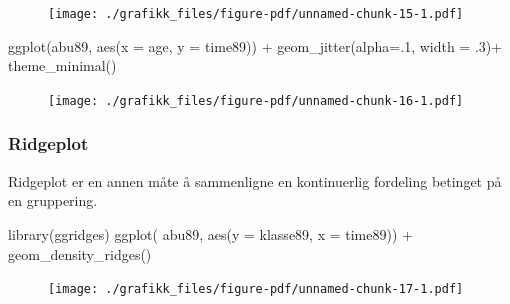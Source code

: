 \documentclass[
  letterpaper,
  DIV=11,
  numbers=noendperiod]{scrreprt}
\newenvironment{Shaded}{\begin{snugshade}}{\end{snugshade}}
\newcommand{\AttributeTok}[1]{\textcolor[rgb]{0.40,0.45,0.13}{#1}}
\newcommand{\DecValTok}[1]{\textcolor[rgb]{0.68,0.00,0.00}{#1}}
\newcommand{\FunctionTok}[1]{\textcolor[rgb]{0.28,0.35,0.67}{#1}}
\newcommand{\NormalTok}[1]{\textcolor[rgb]{0.00,0.23,0.31}{#1}}
\newcommand{\SpecialCharTok}[1]{\textcolor[rgb]{0.37,0.37,0.37}{#1}}
\theoremstyle{definition}
\theoremstyle{remark}
\begin{document}
\begin{figure}[H]

{\centering \texttt{[image: ./grafikk\_files/figure-pdf/unnamed-chunk-15-1.pdf]}

}

\end{figure}

\begin{Shaded}
\begin{Highlighting}[]
\FunctionTok{ggplot}\NormalTok{(abu89, }\FunctionTok{aes}\NormalTok{(}\AttributeTok{x =}\NormalTok{ age, }\AttributeTok{y =}\NormalTok{ time89)) }\SpecialCharTok{+}
  \FunctionTok{geom\_jitter}\NormalTok{(}\AttributeTok{alpha=}\NormalTok{.}\DecValTok{1}\NormalTok{, }\AttributeTok{width =}\NormalTok{ .}\DecValTok{3}\NormalTok{)}\SpecialCharTok{+}
  \FunctionTok{theme\_minimal}\NormalTok{()}
\end{Highlighting}
\end{Shaded}

\begin{figure}[H]

{\centering \texttt{[image: ./grafikk\_files/figure-pdf/unnamed-chunk-16-1.pdf]}

}

\end{figure}

\hypertarget{ridgeplot}{%
\subsubsection{Ridgeplot}\label{ridgeplot}}

Ridgeplot er en annen måte å sammenligne en kontinuerlig fordeling
betinget på en gruppering.

\begin{Shaded}
\begin{Highlighting}[]
\FunctionTok{library}\NormalTok{(ggridges)}
\FunctionTok{ggplot}\NormalTok{( abu89,  }\FunctionTok{aes}\NormalTok{(}\AttributeTok{y =}\NormalTok{ klasse89, }\AttributeTok{x =}\NormalTok{ time89)) }\SpecialCharTok{+}
  \FunctionTok{geom\_density\_ridges}\NormalTok{() }
\end{Highlighting}
\end{Shaded}

\begin{figure}[H]

{\centering \texttt{[image: ./grafikk\_files/figure-pdf/unnamed-chunk-17-1.pdf]}

}

\end{figure}
\end{document}
